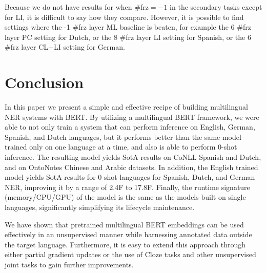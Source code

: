 \documentclass[letterpaper]{article} \usepackage{aaai20}  \usepackage{times}  \usepackage{helvet} \usepackage{courier}  \usepackage[hyphens]{url}  \usepackage{graphicx} \urlstyle{rm} \def\UrlFont{\rm}  \usepackage{graphicx}  \frenchspacing  \setlength{\pdfpagewidth}{8.5in}  \setlength{\pdfpageheight}{11in}  \usepackage{amsmath}
\begin{document}
Because we do not have results for when \#frz$=-1$ in the secondary tasks except for LI, it is difficult to say how they compare. However, it is possible to find settings where the -1 \#frz layer ML baseline is beaten, for example the 6 \#frz layer PC setting for Dutch, or the 8 \#frz layer LI setting for Spanish, or the 6 \#frz layer CL+LI setting for German.

















 \section{Conclusion}

In this paper we present a simple and effective recipe of building multilingual NER systems with BERT. By utilizing a multilingual BERT framework, we were able to not only train a system that can perform inference on English, German, Spanish, and Dutch languages, but it performs better than the same model trained only on one language at a time, and also is able to perform 0-shot inference. The resulting model yields SotA results on CoNLL Spanish and Dutch, and on OntoNotes Chinese and Arabic datasets. In addition, the English trained model yields SotA results for 0-shot languages for Spanish, Dutch, and German NER, improving it by a range of 2.4F to 17.8F. Finally, the runtime signature (memory/CPU/GPU) of the model is the same as the models built on single languages, significantly simplifying its lifecycle maintenance.

We have shown that pretrained multilingual BERT embeddings can be used effectively in an unsupervised manner while harnessing annotated data outside the target language. Furthermore, it is easy to extend this approach through either partial gradient updates or the use of Cloze tasks and other unsupervised joint tasks to gain further improvements.











 


\end{document}
